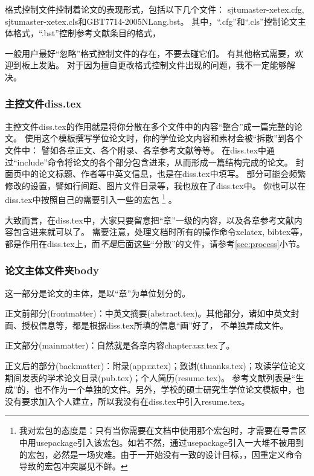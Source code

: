 格式控制文件控制着论文的表现形式，包括以下几个文件：
sjtumaster-xetex.cfg, sjtumaster-xetex.cls和GBT7714-2005NLang.bst。
其中，``.cfg''和``.cls''控制论文主体格式，``.bst''控制参考文献条目的格式，

一般用户最好``忽略''格式控制文件的存在，不要去碰它们。
有其他格式需要，欢迎到板上发贴。
对于因为擅自更改格式控制文件出现的问题，我不一定能够解决。

\subsubsection{主控文件diss.tex}
\label{sec:disstex}

主控文件diss.tex的作用就是将你分散在多个文件中的内容``整合''成一篇完整的论文。
使用这个模板撰写学位论文时，你的学位论文内容和素材会被``拆散''到各个文件中：
譬如各章正文、各个附录、各章参考文献等等。
在diss.tex中通过``include''命令将论文的各个部分包含进来，从而形成一篇结构完成的论文。
封面页中的论文标题、作者等中英文信息，也是在diss.tex中填写。
部分可能会频繁修改的设置，譬如行间距、图片文件目录等，我也放在了diss.tex中。
你也可以在diss.tex中按照自己的需要引入一些的宏包
\footnote{我对宏包的态度是：只有当你需要在文档中使用那个宏包时，才需要在导言区中用usepackage引入该宏包。如若不然，通过usepackage引入一大堆不被用到的宏包，必然是一场灾难。由于一开始没有一致的设计目标，，因重定义命令导致的宏包冲突屡见不鲜。}
。

大致而言，在diss.tex中，大家只要留意把``章''一级的内容，以及各章参考文献内容包含进来就可以了。
需要注意，处理文档时所有的操作命令{}\cndash{}xelatex, bibtex等，都是作用在diss.tex上，而\emph{不是}后面这些``分散''的文件，请参考\ref{sec:process}小节。

\subsubsection{论文主体文件夹body}
\label{sec:thesisbody}

这一部分是论文的主体，是以``章''为单位划分的。

正文前部分(frontmatter)：中英文摘要(abstract.tex)。其他部分，诸如中英文封面、授权信息等，都是根据diss.tex所填的信息``画''好了，
不单独弄成文件。

正文部分(mainmatter)：自然就是各章内容chapter\emph{xxx}.tex了。

正文后的部分(backmatter)：附录(app\emph{xx}.tex)；致谢(thuanks.tex)；攻读学位论文期间发表的学术论文目录(pub.tex)；个人简历(resume.tex)。
参考文献列表是``生成''的，也不作为一个单独的文件。另外，学校的硕士研究生学位论文模板中，也没有要求加入个人建立，所以我没有在diss.tex中引入resume.tex。

